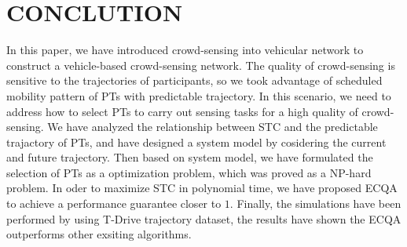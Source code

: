 \documentclass[journal]{IEEEtran}
\begin{document}
\section{CONCLUTION}
In this paper, we have introduced crowd-sensing into vehicular network to construct a vehicle-based crowd-sensing network. The quality of crowd-sensing is sensitive to the trajectories of participants, so we took advantage of scheduled mobility pattern of PTs with predictable trajectory. In this scenario, we need to address how to select PTs to carry out sensing tasks for a high quality of crowd-sensing.
We have analyzed the relationship between STC and the predictable trajactory of PTs, and have designed a system model by cosidering the current and future trajectory. Then based on system model, we have formulated the selection of PTs as a optimization problem, which was proved as a NP-hard problem. In oder to maximize STC in polynomial time, we have proposed ECQA to achieve a performance guarantee closer to $1$. Finally, the simulations have been performed by using T-Drive trajectory dataset, the results have shown the ECQA outperforms other exsiting algorithms.















%
%
\end{document}
